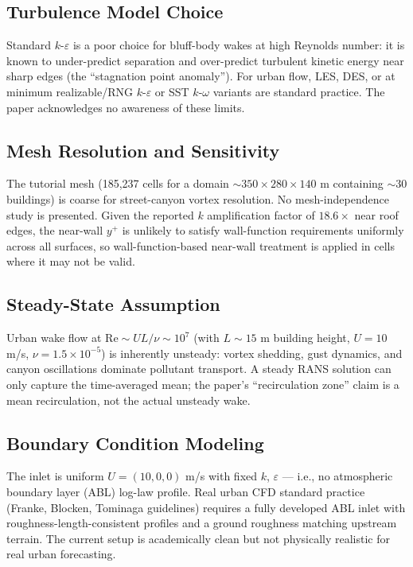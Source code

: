 \documentclass[11pt,a4paper]{article}
\begin{document}
\subsection{Turbulence Model Choice}
Standard $k$-$\varepsilon$ is a poor choice for bluff-body wakes at high
Reynolds number: it is known to under-predict separation and over-predict
turbulent kinetic energy near sharp edges (the ``stagnation point anomaly'').
For urban flow, LES, DES, or at minimum realizable/RNG $k$-$\varepsilon$ or
SST $k$-$\omega$ variants are standard practice. The paper acknowledges no
awareness of these limits.

\subsection{Mesh Resolution and Sensitivity}
The tutorial mesh (185{,}237 cells for a domain $\sim\!350\times 280\times 140$
m containing $\sim\!30$ buildings) is coarse for street-canyon vortex
resolution. No mesh-independence study is presented. Given the reported
$k$ amplification factor of $18.6\times$ near roof edges, the near-wall
$y^+$ is unlikely to satisfy wall-function requirements uniformly across all
surfaces, so wall-function-based near-wall treatment is applied in cells
where it may not be valid.

\subsection{Steady-State Assumption}
Urban wake flow at $\mathrm{Re}\sim UL/\nu \sim 10^7$ (with $L\sim 15$ m
building height, $U=10$ m/s, $\nu=1.5{\times}10^{-5}$) is inherently
unsteady: vortex shedding, gust dynamics, and canyon oscillations dominate
pollutant transport. A steady RANS solution can only capture the
time-averaged mean; the paper's ``recirculation zone'' claim is a mean
recirculation, not the actual unsteady wake.

\subsection{Boundary Condition Modeling}
The inlet is uniform $U=(10,0,0)$ m/s with fixed $k$, $\varepsilon$ ---
i.e., no atmospheric boundary layer (ABL) log-law profile. Real
urban CFD standard practice (Franke, Blocken, Tominaga guidelines) requires
a fully developed ABL inlet with roughness-length-consistent profiles and a
ground roughness matching upstream terrain. The current setup is
academically clean but not physically realistic for real urban forecasting.
\end{document}
